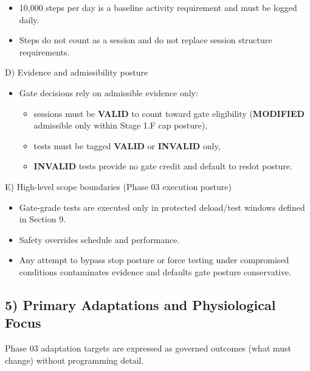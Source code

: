 \documentclass[10pt]{article}
\begin{document}
\begin{itemize}
\item 10,000 steps per day is a baseline activity requirement and must be logged daily.
\item Steps do not count as a session and do not replace session structure requirements.
\end{itemize}

D) Evidence and admissibility posture

\begin{itemize}
\item Gate decisions rely on admissible evidence only:
  \begin{itemize}
  \item sessions must be \textbf{VALID} to count toward gate eligibility (\textbf{MODIFIED} admissible only within Stage 1.F cap posture),
  \item tests must be tagged \textbf{VALID} or \textbf{INVALID} only,
  \item \textbf{INVALID} tests provide no gate credit and default to reslot posture.
  \end{itemize}
\end{itemize}

E) High-level scope boundaries (Phase 03 execution posture)

\begin{itemize}
\item Gate-grade tests are executed only in protected deload/test windows defined in Section 9.
\item Safety overrides schedule and performance.
\item Any attempt to bypass stop posture or force testing under compromised conditions contaminates evidence and defaults gate posture conservative.
\end{itemize}

\subsection*{5) Primary Adaptations and Physiological Focus}

Phase 03 adaptation targets are expressed as governed outcomes (what must change) without programming detail.
\end{document}
